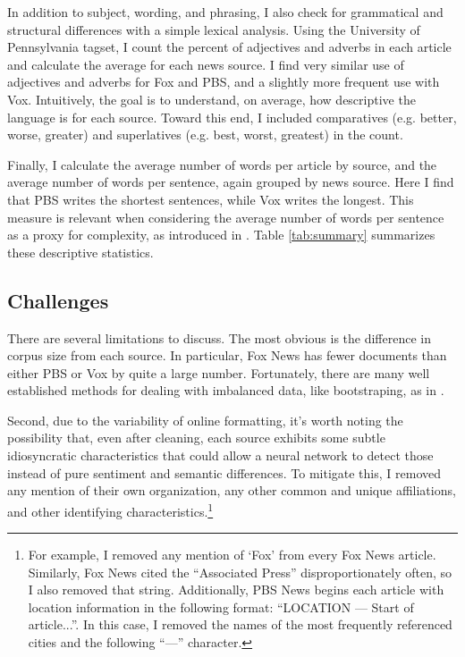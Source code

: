 \documentclass{article}
\begin{document}
	    In addition to subject, wording, and phrasing, I also check for grammatical and structural differences with a simple lexical analysis. Using the University of Pennsylvania tagset, I count the percent of adjectives and adverbs in each article and calculate the average for each news source. I find very similar use of adjectives and adverbs for Fox and PBS, and a slightly more frequent use with Vox. Intuitively, the goal is to understand, on average, how descriptive the language is for each source. Toward this end, I included comparatives (e.g. better, worse, greater) and superlatives (e.g. best, worst, greatest) in the count.
	    
	    Finally, I calculate the average number of words per article by source, and the average number of words per sentence, again grouped by news source. Here I find that PBS writes the shortest sentences, while Vox writes the longest. This measure is relevant when considering the average number of words per sentence as a proxy for complexity, as introduced in \citet{flesch1948new}. Table \ref{tab:summary} summarizes these descriptive statistics.  
 
    	
	    
	\subsection{Challenges} \label{Challenges}
	    There are several limitations to discuss. The most obvious is the difference in corpus size from each source. In particular, Fox News has fewer documents than either PBS or Vox by quite a large number. Fortunately, there are many well established methods for dealing with imbalanced data, like bootstraping, as in \citet{dupret2001bootstrap}. 
	    
	    Second, due to the variability of online formatting, it's worth noting the possibility that, even after cleaning, each source exhibits some subtle idiosyncratic characteristics that could allow a neural network to detect those instead of pure sentiment and semantic differences. To mitigate this, I removed any mention of their own organization, any other common and unique affiliations, and other identifying characteristics.\footnote{For example, I removed any mention of `Fox' from every Fox News article. Similarly, Fox News cited the ``Associated Press'' disproportionately often, so I also removed that string. Additionally, PBS News begins each article with location information in the following format: ``LOCATION --- Start of article...''. In this case, I removed the names of the most frequently referenced cities and the following ``---'' character.} 
	    
\end{document}
